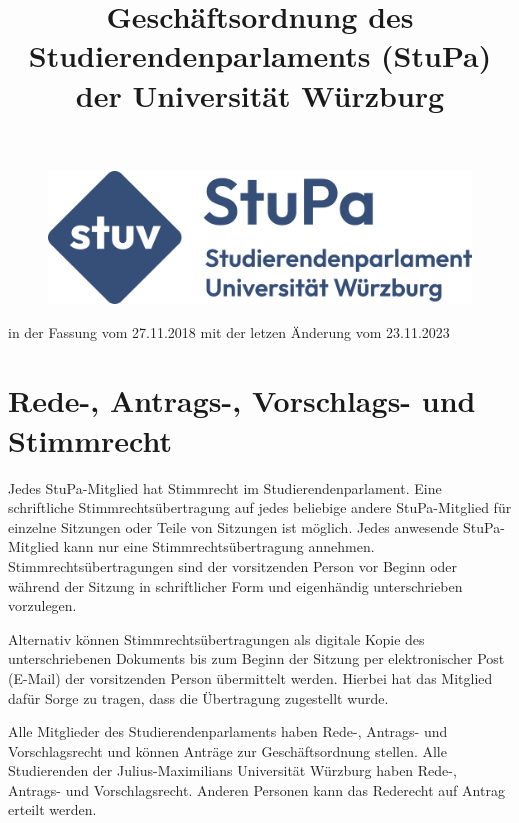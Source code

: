\documentclass[10pt,a4paper]{scrartcl}
\title{\LARGE Geschäftsordnung des Studierendenparlaments (StuPa) der Universität Würzburg}
\date{}
\begin{document}
\maketitle

\begin{figure}[h]
	\includegraphics[width=\textwidth]{logo.eps}
\end{figure}


\vspace{4cm}

{\centering \Large \sffamily in der Fassung vom 27.11.2018 mit der letzen Änderung
vom 23.11.2023}

\pagebreak

\setcounter{tocdepth}{4}
\tableofcontents

\pagebreak


\section{Rede-, Antrags-, Vorschlags- und
Stimmrecht}\label{rede--antrags--vorschlags--und-stimmrecht}

\begin{contract}

\label{stimmrecht-und-stimmrechtsuebertragungen}

Jedes StuPa-Mitglied hat Stimmrecht im Studierendenparlament. Eine
schriftliche Stimmrechtsübertragung auf jedes beliebige andere
StuPa-Mitglied für einzelne Sitzungen oder Teile von Sitzungen ist
möglich. Jedes anwesende StuPa-Mitglied kann nur eine
Stimmrechtsübertragung annehmen. Stimmrechtsübertragungen sind der
vorsitzenden Person vor Beginn oder während der Sitzung in schriftlicher
Form und eigenhändig unterschrieben vorzulegen.

Alternativ können Stimmrechtsübertragungen als digitale Kopie des
unterschriebenen Dokuments bis zum Beginn der Sitzung per elektronischer Post
(E-Mail) der vorsitzenden Person übermittelt werden. Hierbei hat das Mitglied
dafür Sorge zu tragen, dass die Übertragung zugestellt wurde.


\label{rede--antrags--und-vorschlagsrecht}

Alle Mitglieder des Studierendenparlaments haben Rede-, Antrags- und
Vorschlagsrecht und können Anträge zur Geschäftsordnung stellen. Alle
Studierenden der Julius-Maximilians Universität Würzburg haben Rede-,
Antrags- und Vorschlagsrecht. Anderen Personen kann das Rederecht auf
Antrag erteilt werden.

\end{contract}
\end{document}

